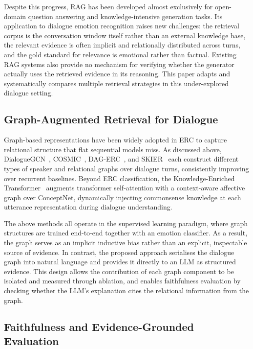 \documentclass[runningheads]{llncs}
\begin{document}
Despite this progress, RAG has been developed almost exclusively for
open-domain question answering and knowledge-intensive generation tasks.
Its application to dialogue emotion recognition raises new challenges:
the retrieval corpus is the conversation window itself rather than an
external knowledge base, the relevant evidence is often implicit and
relationally distributed across turns, and the gold standard for
relevance is emotional rather than factual. Existing RAG systems
also provide no mechanism for verifying whether the generator actually
uses the retrieved evidence in its reasoning. This paper adapts and
systematically compares multiple retrieval strategies in this
under-explored dialogue setting.

\subsection{Graph-Augmented Retrieval for Dialogue}

Graph-based representations have been widely adopted in ERC to capture
relational structure that flat sequential models miss. As discussed above,
DialogueGCN~\cite{ghosal2019dialoguegcn}, COSMIC~\cite{ghosal2020cosmic},
DAG-ERC~\cite{shen2021dag}, and SKIER~\cite{li2023skier} each construct
different types of speaker and relational graphs over dialogue turns,
consistently improving over recurrent baselines. Beyond ERC classification,
the Knowledge-Enriched Transformer~\cite{zhong2019ket} augments transformer
self-attention with a context-aware affective graph over ConceptNet,
dynamically injecting commonsense knowledge at each utterance representation
during dialogue understanding.

The above methods all operate in the supervised learning paradigm, where
graph structures are trained end-to-end together with an emotion
classifier. As a result, the graph serves as an implicit inductive bias
rather than an explicit, inspectable source of evidence. In contrast,
the proposed approach serialises the dialogue graph into natural language and
provides it directly to an LLM as structured evidence. This design allows
the contribution of each graph component to be isolated and measured
through ablation, and enables faithfulness evaluation by checking whether
the LLM's explanation cites the relational information from the graph.

\subsection{Faithfulness and Evidence-Grounded Evaluation}
\end{document}

